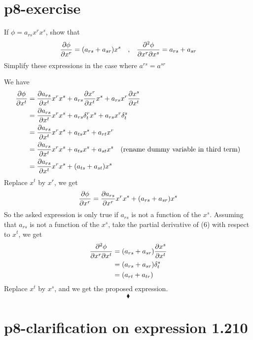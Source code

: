 \section{p8-exercise}

\begin{tcolorbox}
If $\phi = a_{rs}x^rx^s$, show that
$$\pdv{\phi}{x^{r}} = (a_{rs}+a_{sr})x^s \quad\text{,}\quad\pdv{\phi}{x^{r}}{x^{s}} = a_{rs}+a_{sr}$$
Simplify these expressions in the case where $a^{rs} = a^{sr}$
\end{tcolorbox}
We have 
\begin{align} 
\pdv{\phi}{x^{t}} &= \pdv{a_{rs}}{x^{t}}x^{r}x^{s}+a_{rs}\pdv{x^{r}}{x^{t}}x^{s}+a_{rs}x^{r}\pdv{x^{s}}{x^{t}}\\
&= \pdv{a_{rs}}{x^{t}}x^{r}x^{s}+a_{rs}\delta_t^rx^{s}+a_{rs}x^{r}\delta^s_t\\
&= \pdv{a_{rs}}{x^{t}}x^{r}x^{s}+a_{ts}x^{s}+a_{rt}x^{r}\\
&= \pdv{a_{rs}}{x^{t}}x^{r}x^{s}+a_{ts}x^{s}+a_{st}x^{s}\quad\text{(rename dummy variable in third term)}\\
&= \pdv{a_{rs}}{x^{t}}x^{r}x^{s}+(a_{ts}+a_{st})x^{s}
\end{align}
Replace $x^t$ by $x^r$, we get
\begin{align}
\pdv{\phi}{x^{r}}  =\pdv{a_{rs}}{x^{r}}x^{r}x^{s}+(a_{rs}+a_{sr})x^{s}
\end{align}
So the asked expression is only true if $a_{rs}$ is not a function of the $x^{s}$.
Assuming that $a_{rs}$ is not a function of the $x^{s}$, take the partial derivative of (6) with respect to $x^{t}$, we get
\begin{align} 
\pdv{\phi}{x^{r}}{x^{t}} &= (a_{rs}+a_{sr})\pdv{x^{s}}{x^{t}}\\
&=(a_{rs}+a_{sr})\delta^{s}_{t}\\
&=(a_{rt}+a_{tr})
\end{align}
Replace $x^t$ by $x^s$, and we get the proposed expression.
$$\blacklozenge$$
\pagebreak[4]

\section{p8-clarification on expression 1.210}

